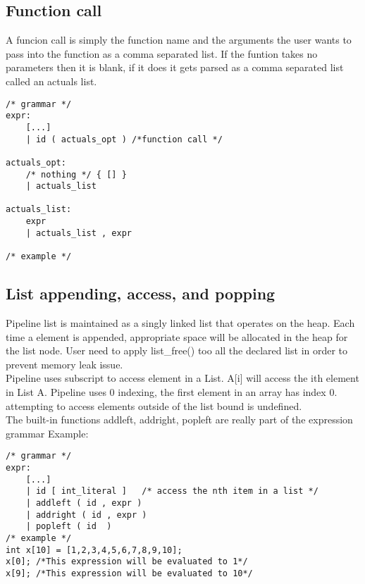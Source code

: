 \documentclass[./Report_main.tex]{subfiles}
\begin{document}
\subsection{Function call}
A funcion call is simply the function name and the arguments the user wants to pass into the function as a comma separated list. If the funtion takes no parameters then it is blank, if it does it gets parsed as a comma separated list called an actuals list.
\begin{lstlisting}
/* grammar */
expr:
	[...]
    | id ( actuals_opt ) /*function call */
    
actuals_opt:
    /* nothing */ { [] }
    | actuals_list

actuals_list:
    expr
    | actuals_list , expr

/* example */

\end{lstlisting}
\subsection{List appending, access, and popping}
Pipeline list is maintained as a singly linked list that operates on the heap. Each time a element is appended, appropriate space will be allocated in the heap for the list node. User need to apply list\_free() too all the declared list in order to prevent memory leak issue.\\   
Pipeline uses subscript to access element in a List. A[i] will access the ith element in List A. Pipeline uses 0 indexing, the first element in an array has index 0.\\
attempting to access elements outside of the list bound is undefined.\\
The built-in functions addleft, addright, popleft are really part of the expression grammar
Example:
\begin{lstlisting}
/* grammar */
expr:
	[...]
    | id [ int_literal ]   /* access the nth item in a list */ 
    | addleft ( id , expr )  
    | addright ( id , expr ) 
    | popleft ( id  ) 
/* example */
int x[10] = [1,2,3,4,5,6,7,8,9,10];
x[0]; /*This expression will be evaluated to 1*/
x[9]; /*This expression will be evaluated to 10*/
\end{lstlisting}
\end{document}
